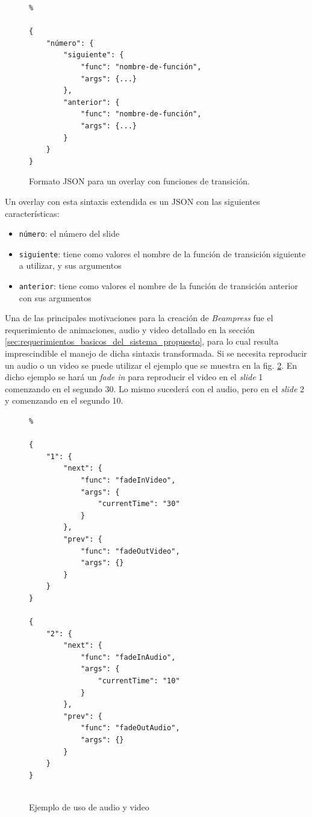 		\begin{figure}[htb]%
			\begin{lstlisting}%

{
    "número": {
        "siguiente": {
            "func": "nombre-de-función",
            "args": {...}
        },
        "anterior": {
            "func": "nombre-de-función",
            "args": {...}
        }
    }
}	
			\end{lstlisting}
		\caption{
			Formato JSON para un overlay con funciones de transición. 
			\label{fig:json_format} }
		\end{figure}


	Un overlay con esta sintaxis extendida es un JSON con las siguientes características:
	\begin{itemize}
		\item \texttt{número}: el número del slide
		\item \texttt{siguiente}: tiene como valores el nombre de la función de transición siguiente a utilizar, y sus argumentos
		\item \texttt{anterior}: tiene como valores el nombre de la función de transición anterior con sus argumentos
	\end{itemize}

	Una de las principales motivaciones para la creación de \textit{Beampress} fue el requerimiento de animaciones, audio y video detallado en la sección \ref{sec:requerimientos_basicos_del_sistema_propuesto}, para lo cual resulta imprescindible el manejo de dicha sintaxis transformada. Si se necesita reproducir un audio o un video se puede utilizar el ejemplo que se muestra en la fig. \ref{fig:ex_audio_video_syntax}. En dicho ejemplo se hará un \textit{fade in} para reproducir el video en el \textit{slide} 1 comenzando en el segundo 30. Lo mismo sucederá con el audio, pero en el \textit{slide} 2 y comenzando en el segundo 10.


	\begin{figure}[htb]%
		\begin{lstlisting}%

{
    "1": {
        "next": {
            "func": "fadeInVideo",
            "args": {
                "currentTime": "30"
            }
        },
        "prev": {
            "func": "fadeOutVideo",
            "args": {}
        }
    }
}

{
    "2": {
        "next": {
            "func": "fadeInAudio",
            "args": {
                "currentTime": "10"
            }
        },
        "prev": {
            "func": "fadeOutAudio",
            "args": {}
        }
    }
}
				
		\end{lstlisting}
		\caption{Ejemplo de uso de audio y video} 
			\label{fig:ex_audio_video_syntax}
		\end{figure}

